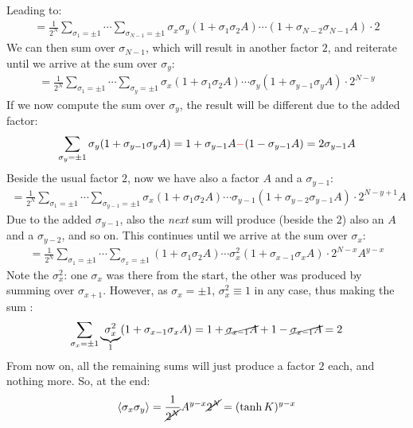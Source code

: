 \documentclass[../../main.tex]{subfiles}
\begin{document}
Leading to:
\begin{align*}
    =\frac{1}{2^N} \sum_{\sigma_1 = \pm 1} \cdots \sum_{\sigma_{N-1} = \pm 1}
    \sigma_x \sigma_y(1+\sigma_1 \sigma_2 A)\cdots(1+\sigma_{N-2}\sigma_{N-1}A) \cdot 2
\end{align*}
We can then sum over $\sigma_{N-1}$, which will result in another factor $2$, and reiterate until we arrive at the sum over $\sigma_y$:
\begin{align*}
    =\frac{1}{2^N} \sum_{\sigma_1=\pm 1} \cdots \sum_{\sigma_y = \pm 1} \sigma_x (1+ \sigma_1 \sigma_2 A) \cdots  \sigma_y(1+\sigma_{y-1} \sigma_yA) \cdot 2^{N-y}
\end{align*}
If we now compute the sum over $\sigma_y$, the result will be different due to the added factor:
\begin{align*}
    \sum_{\sigma_y = \pm 1} \sigma_y(1+\sigma_{y-1} \sigma_yA) = 1 + \sigma_{y-1}A \textcolor{Red}{-}(1 - \sigma_{y-1}A) = 2 \sigma_{y-1}A
\end{align*}
Beside the usual factor $2$, now we have also a factor $A$ and a $\sigma_{y-1}$:
\begin{align*}
    =\frac{1}{2^N} \sum_{\sigma_1 = \pm 1} \cdots \sum_{\sigma_{y-1} = \pm 1} \sigma_x (1+\sigma_1 \sigma_2 A) \cdots \sigma_{y-1} (1+\sigma_{y-2}\sigma_{y-1}A) \cdot 2^{N-y+1} A 
\end{align*}
Due to the added $\sigma_{y-1}$, also the \textit{next} sum will produce (beside the $2$) also an $A$ and a $\sigma_{y-2}$, and so on. This continues until we arrive at the sum over $\sigma_x$:
\begin{align*}
    = \frac{1}{2^N} \sum_{\sigma_1=\pm 1} \cdots \sum_{\sigma_x = \pm 1} (1+\sigma_1 \sigma_2 A) \cdots \sigma_x^2(1+\sigma_{x-1}\sigma_xA) \cdot 2^{N-x} A^{y-x}
\end{align*} 
Note the $\sigma_x^2$: one $\sigma_x$ was there from the start, the other was produced by summing over $\sigma_{x+1}$. However, as $\sigma_x = \pm 1$, $\sigma_x^2 \equiv 1$ in any case, thus making the sum :
\begin{align*}
    \sum_{\sigma_x = \pm 1} \underbrace{\sigma_x^2}_{1} (1+\sigma_{x-1}\sigma_xA) = 1 + \cancel{\sigma_{x-1}A} + 1 - \cancel{\sigma_{x-1}A} = 2
\end{align*}
From now on, all the remaining sums will just produce a factor $2$ each, and nothing more. So, at the end:
\begin{align*}
    \langle \sigma_x \sigma_y \rangle = \frac{1}{\cancel{2^N}} A^{y-x} \cancel{2^N} = (\tanh K)^{y-x}
\end{align*}
\end{document}
